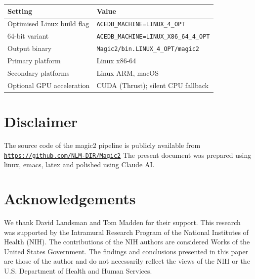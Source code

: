 \documentclass[11pt]{article}
\begin{document}
\begin{center}
\begin{tabular}{ll}
\toprule
Setting & Value \\
\midrule
Optimised Linux build flag & \texttt{ACEDB\_MACHINE=LINUX\_4\_OPT} \\
64-bit variant             & \texttt{ACEDB\_MACHINE=LINUX\_X86\_64\_4\_OPT} \\
Output binary              & \texttt{Magic2/bin.LINUX\_4\_OPT/magic2} \\
Primary platform           & Linux x86-64 \\
Secondary platforms        & Linux ARM, macOS \\
Optional GPU acceleration  & CUDA (Thrust); silent CPU fallback \\
\bottomrule
\end{tabular}
\end{center}


\section*{Disclaimer}

The source code of the magic2 pipeline
is publicly available from \href{https://github.com/NLM-DIR/Magic2}{\texttt{https://github.com/NLM-DIR/Magic2}}
The present document was prepared using linux, emacs, latex
and polished using Claude AI.

\section*{Acknowledgements}

We thank David Landsman and Tom Madden for their support.
This research was supported by the Intramural Research Program of the National Institutes of Health (NIH). The contributions of the NIH authors are considered Works of the United States Government. The findings and conclusions presented in this paper are those of the author and do not necessarily reflect the views of the NIH or the U.S. Department of Health and Human Services.




\end{document}
